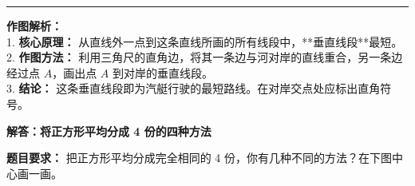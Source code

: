 \documentclass[12pt, a4paper]{ctexart}
\begin{document}
\vspace{1.0cm}
\hrule
\vspace{0.4cm}

{\small
\textbf{作图解析：} \\
1. \textbf{核心原理：} 从直线外一点到这条直线所画的所有线段中，**垂直线段**最短。 \\
2. \textbf{作图方法：} 利用三角尺的直角边，将其一条边与河对岸的直线重合，另一条边经过点 $A$，画出点 $A$ 到对岸的垂直线段。 \\
3. \textbf{结论：} 这条垂直线段即为汽艇行驶的最短路线。在对岸交点处应标出直角符号。
}


\newpage

\begin{center}
  {\large\bfseries 解答：将正方形平均分成 4 份的四种方法}
\end{center}

\vspace{0.6cm}

\noindent
{\small \textbf{题目要求：} 把正方形平均分成完全相同的 4 份，你有几种不同的方法？在下图中心画一画。}

\vspace{1.0cm}
\end{document}
